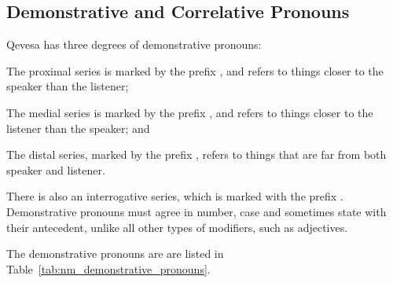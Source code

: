 \documentclass[grammar]{subfiles}
\begin{document}

  \subsection{Demonstrative and Correlative Pronouns}
  \label{ssec:nm_demonstrative_pronouns}

  Qevesa has three degrees of demonstrative pronouns:

  \begin{description}[style=nextline]
    \item[Proximal] The proximal series is marked by the prefix , and refers to things closer to the speaker than the listener;
    \item[Medial] The medial series is marked by the prefix , and refers to things closer to the listener than the speaker; and
    \item[Distal] The distal series, marked by the prefix , refers to things that are far from both speaker and listener.
  \end{description}

  There is also an interrogative series, which is marked with the prefix .  Demonstrative pronouns must agree in number, case and sometimes state with their antecedent, unlike all other types of modifiers, such as adjectives. 


  The demonstrative pronouns are are listed in Table~\ref{tab:nm_demonstrative_pronouns}.
\end{document}
